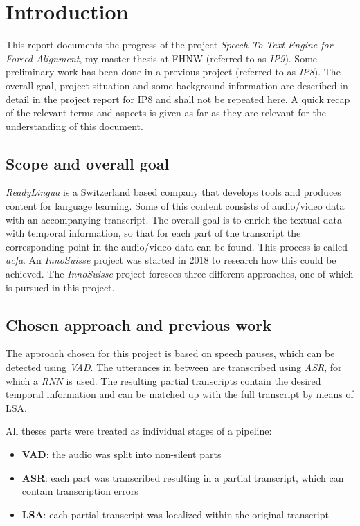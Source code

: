 \section{Introduction}\label{intro}
This report documents the progress of the project \textit{Speech-To-Text Engine for Forced Alignment}, my master thesis at \ac{FHNW} (referred to as \textit{IP9}). Some preliminary work has been done in a previous project (referred to as \textit{IP8}). The overall goal, project situation and some background information are described in detail in the project report for IP8 and shall not be repeated here. A quick recap of the relevant terms and aspects is given as far as they are relevant for the understanding of this document.

\subsection{Scope and overall goal}
\textit{ReadyLingua} is a Switzerland based company that develops tools and produces content for language learning. Some of this content consists of audio/video data with an accompanying transcript. The overall goal is to enrich the textual data with temporal information, so that for each part of the transcript the corresponding point in the audio/video data can be found. This process is called \textit{ac{fa}}. An \textit{InnoSuisse} project was started in 2018 to research how this could be achieved. The \textit{InnoSuisse} project foresees three different approaches, one of which is pursued in this project.

\subsection{Chosen approach and previous work}
The approach chosen for this project is based on speech pauses, which can be detected using \textit{\ac{VAD}}. The utterances in between are transcribed using \textit{\ac{ASR}}, for which a \textit{\ac{RNN}} is used. The resulting partial transcripts contain the desired temporal information and can be matched up with the full transcript by means of \ac{LSA}.

All theses parts were treated as individual stages of a pipeline:

\begin{itemize}
	\item \textbf{\ac{VAD}}: the audio was split into non-silent parts
	\item \textbf{\ac{ASR}}: each part was transcribed resulting in a partial transcript, which can contain transcription errors
	\item \textbf{\ac{LSA}}: each partial transcript was localized within the original transcript	
\end{itemize}

